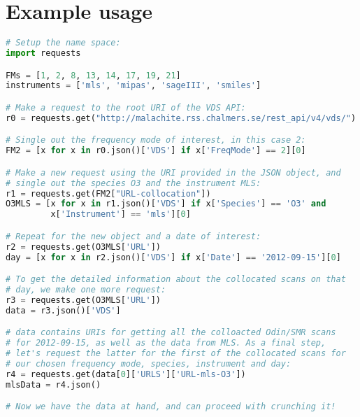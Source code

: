 \section{Example usage}
\label{sec:api_usage}
\begin{lstlisting}[language=Python, basicstyle=\footnotesize]
# Setup the name space:
import requests

FMs = [1, 2, 8, 13, 14, 17, 19, 21]
instruments = ['mls', 'mipas', 'sageIII', 'smiles']

# Make a request to the root URI of the VDS API:
r0 = requests.get("http://malachite.rss.chalmers.se/rest_api/v4/vds/")

# Single out the frequency mode of interest, in this case 2:
FM2 = [x for x in r0.json()['VDS'] if x['FreqMode'] == 2][0]

# Make a new request using the URI provided in the JSON object, and
# single out the species O3 and the instrument MLS:
r1 = requests.get(FM2["URL-collocation"])
O3MLS = [x for x in r1.json()['VDS'] if x['Species'] == 'O3' and
         x['Instrument'] == 'mls'][0]

# Repeat for the new object and a date of interest:
r2 = requests.get(O3MLS['URL'])
day = [x for x in r2.json()['VDS'] if x['Date'] == '2012-09-15'][0]

# To get the detailed information about the collocated scans on that
# day, we make one more request:
r3 = requests.get(O3MLS['URL'])
data = r3.json()['VDS']

# data contains URIs for getting all the colloacted Odin/SMR scans
# for 2012-09-15, as well as the data from MLS. As a final step,
# let's request the latter for the first of the collocated scans for
# our chosen frequency mode, species, instrument and day:
r4 = requests.get(data[0]['URLS']['URL-mls-O3'])
mlsData = r4.json()

# Now we have the data at hand, and can proceed with crunching it!
\end{lstlisting}
